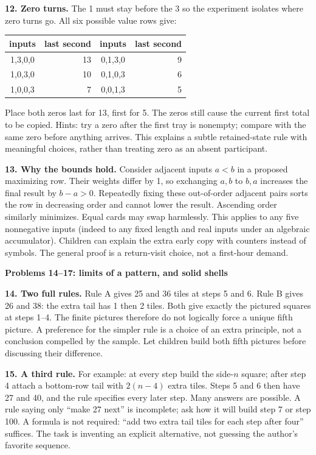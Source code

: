 \documentclass[11pt]{article}
\newcommand{\heading}[1]{\par\textbf{#1}\par}
\begin{document}
\textbf{12. Zero turns.} The 1 must stay before the 3 so the experiment isolates where zero turns go. All six possible value rows give:
\begin{center}\begin{tabular}{c|r@{\qquad}c|r}
inputs&last second&inputs&last second\\\hline
1,3,0,0&13&0,1,3,0&9\\
1,0,3,0&10&0,1,0,3&6\\
1,0,0,3&7&0,0,1,3&5
\end{tabular}\end{center}
Place both zeros last for 13, first for 5. The zeros still cause the current first total to be copied. Hints: try a zero after the first tray is nonempty; compare with the same zero before anything arrives. This explains a subtle retained-state rule with meaningful choices, rather than treating zero as an absent participant.

\textbf{13. Why the bounds hold.} Consider adjacent inputs $a<b$ in a proposed maximizing row. Their weights differ by 1, so exchanging $a,b$ to $b,a$ increases the final result by $b-a>0$. Repeatedly fixing these out-of-order adjacent pairs sorts the row in decreasing order and cannot lower the result. Ascending order similarly minimizes. Equal cards may swap harmlessly. This applies to any five nonnegative inputs (indeed to any fixed length and real inputs under an algebraic accumulator). Children can explain the extra early copy with counters instead of symbols. The general proof is a return-visit choice, not a first-hour demand.
\newpage
\heading{Problems 14--17: limits of a pattern, and solid shells}
\textbf{14. Two full rules.} Rule A gives 25 and 36 tiles at steps 5 and 6. Rule B gives 26 and 38: the extra tail has 1 then 2 tiles. Both give exactly the pictured squares at steps 1--4. The finite pictures therefore do not logically force a unique fifth picture. A preference for the simpler rule is a choice of an extra principle, not a conclusion compelled by the sample. Let children build both fifth pictures before discussing their difference.

\textbf{15. A third rule.} For example: at every step build the side-$n$ square; after step 4 attach a bottom-row tail with $2(n-4)$ extra tiles. Steps 5 and 6 then have 27 and 40, and the rule specifies every later step. Many answers are possible. A rule saying only ``make 27 next'' is incomplete; ask how it will build step 7 or step 100. A formula is not required: ``add two extra tail tiles for each step after four'' suffices. The task is inventing an explicit alternative, not guessing the author's favorite sequence.
\end{document}
